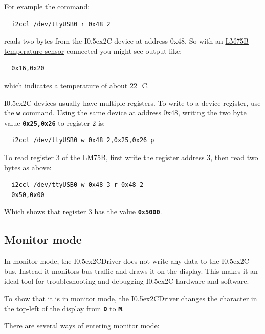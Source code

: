 \documentclass{article}
\newcommand{\two}{\raise0.5ex\hbox{\footnotesize{2}}}
\newcommand{\iic}{I\two{}C}
\newcommand{\iicdriver}{I\two{}CDriver}
\newcommand{\degc}{$^{\circ}$C}
\newcommand{\mach}[1]{\texttt{\textbf{#1}}}
\begin{document}
For example the command:

\begin{lstlisting}
  i2ccl /dev/ttyUSB0 r 0x48 2
\end{lstlisting}

reads two bytes from the \iic{} device at address 0x48.
So with an
\href{https://www.nxp.com/docs/en/data-sheet/LM75B.pdf}{LM75B temperature sensor}
connected you might see output like:

\begin{lstlisting}
  0x16,0x20
\end{lstlisting}

which indicates a temperature of about 22 \degc.

\iic{} devices usually have multiple registers. To write to a device register,
use the \mach{w} command.
Using the same device at address 0x48, writing the two byte value \mach{0x25,0x26} to register 2 is:

\begin{lstlisting}
  i2ccl /dev/ttyUSB0 w 0x48 2,0x25,0x26 p
\end{lstlisting}

To read register 3 of the LM75B, first write the register address 3, then read two bytes as above:

\begin{lstlisting}
  i2ccl /dev/ttyUSB0 w 0x48 3 r 0x48 2
  0x50,0x00
\end{lstlisting}

Which shows that register 3 has the value \mach{0x5000}.

\subsection{Monitor mode}

In monitor mode, the \iicdriver{} does not write any data to the \iic{} bus.
Instead it monitors bus traffic and draws it on the display.
This makes it an ideal tool for troubleshooting and debugging \iic{} hardware and software.

To show that it is in monitor mode, the \iicdriver{} changes the character in the top-left of the display from \mach{D} to \mach{M}.

There are several ways of entering monitor mode:
\end{document}
